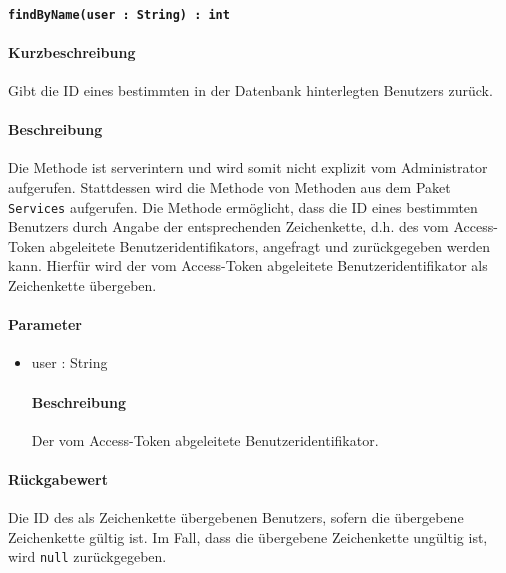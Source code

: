 \paragraph{\texttt{findByName(user : String) : int}}%
\paragraph*{Kurzbeschreibung}
Gibt die ID eines bestimmten in der Datenbank hinterlegten Benutzers zurück.
\paragraph*{Beschreibung}
Die Methode ist serverintern und wird somit nicht explizit vom Administrator aufgerufen.
Stattdessen wird die Methode von Methoden aus dem Paket \texttt{Services} aufgerufen.
Die Methode ermöglicht, dass die ID eines bestimmten Benutzers durch Angabe der entsprechenden Zeichenkette, d.h. des vom Access-Token abgeleitete Benutzeridentifikators, angefragt und zurückgegeben werden kann.
Hierfür wird der vom Access-Token abgeleitete Benutzeridentifikator als Zeichenkette übergeben.
\paragraph*{Parameter}
\begin{itemize}
    \item user : String
    		\paragraph*{Beschreibung}
    		Der vom Access-Token abgeleitete Benutzeridentifikator.
\end{itemize}
\paragraph*{Rückgabewert}
Die ID des als Zeichenkette übergebenen Benutzers, sofern die übergebene Zeichenkette gültig ist.
Im Fall, dass die übergebene Zeichenkette ungültig ist, wird \texttt{null} zurückgegeben.
